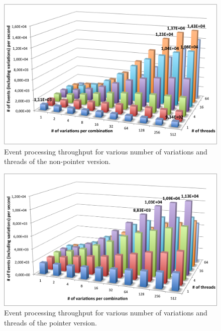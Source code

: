 \begin{figure}[!htp]
	\begin{center}
		\includegraphics[scale=0.6]{../../common/graphs/throughput.png}
		\caption{Event processing throughput for various number of variations and threads of the non-pointer version.}
		\label{fig:EventThroughput}
	\end{center}
\end{figure}

\begin{figure}[!htp]
	\begin{center}
		\includegraphics[scale=0.6]{../../common/graphs/throughput_pointer.png}
		\caption{Event processing throughput for various number of variations and threads of the pointer version.}
		\label{fig:EventThroughputPointer}
	\end{center}
\end{figure}

